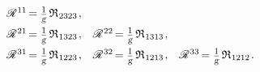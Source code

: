 \begin{otherlanguage}{russian}
\vspace{.1em}\begin{equation*}
\begin{array}{ccc}
\mathscr{R}^{\hspace{.1ex}11} \hspace{-0.3ex} =
\scalebox{0.8}{$ \displaystyle \frac{\raisemath{-0.2em}{1}}{\raisemath{.15em}{\smash{\textsl{g}}}} $} \hspace{.4ex} \mathfrak{R}_{\hspace{.1ex}2323}
\hspace{.2ex} ,
&
&
\\[.6em]
%
\mathscr{R}^{\hspace{.1ex}21} \hspace{-0.3ex} =
\scalebox{0.8}{$ \displaystyle \frac{\raisemath{-0.2em}{1}}{\raisemath{.15em}{\smash{\textsl{g}}}} $} \hspace{.4ex} \mathfrak{R}_{\hspace{.1ex}1323}
\hspace{.2ex} ,
&
\mathscr{R}^{\hspace{.1ex}22} \hspace{-0.3ex} =
\scalebox{0.8}{$ \displaystyle \frac{\raisemath{-0.2em}{1}}{\raisemath{.15em}{\smash{\textsl{g}}}} $} \hspace{.4ex} \mathfrak{R}_{\hspace{.1ex}1313}
\hspace{.2ex} ,
&
\\[.6em]
%
\mathscr{R}^{\hspace{.1ex}31} \hspace{-0.3ex} =
\scalebox{0.8}{$ \displaystyle \frac{\raisemath{-0.2em}{1}}{\raisemath{.15em}{\smash{\textsl{g}}}} $} \hspace{.4ex} \mathfrak{R}_{\hspace{.1ex}1223}
\hspace{.2ex} ,
&
\mathscr{R}^{\hspace{.1ex}32} \hspace{-0.3ex} =
\scalebox{0.8}{$ \displaystyle \frac{\raisemath{-0.2em}{1}}{\raisemath{.15em}{\smash{\textsl{g}}}} $} \hspace{.4ex} \mathfrak{R}_{\hspace{.1ex}1213}
\hspace{.2ex} ,
&
\mathscr{R}^{\hspace{.1ex}33} \hspace{-0.3ex} =
\scalebox{0.8}{$ \displaystyle \frac{\raisemath{-0.2em}{1}}{\raisemath{.15em}{\smash{\textsl{g}}}} $} \hspace{.4ex} \mathfrak{R}_{\hspace{.1ex}1212}
\hspace{.2ex} .
\end{array}
\end{equation*}


\end{otherlanguage}
